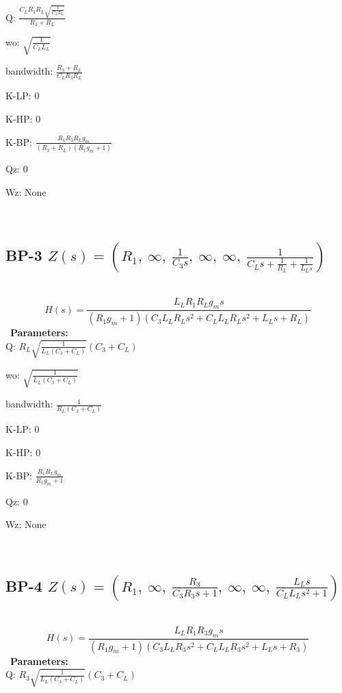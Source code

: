 \documentclass{article}
\begin{document}
Q: $\frac{C_{L} R_{3} R_{L} \sqrt{\frac{1}{C_{L} L_{L}}}}{R_{3} + R_{L}}$\ 

wo: $\sqrt{\frac{1}{C_{L} L_{L}}}$\ 

bandwidth: $\frac{R_{3} + R_{L}}{C_{L} R_{3} R_{L}}$\ 

K-LP: $0$\ 

K-HP: $0$\ 

K-BP: $\frac{R_{1} R_{3} R_{L} g_{m}}{\left(R_{3} + R_{L}\right) \left(R_{1} g_{m} + 1\right)}$\ 

Qz: $0$\ 

Wz: $\text{None}$\ 

\ 

\subsection{BP-3 $Z(s) = \left( R_{1}, \  \infty, \  \frac{1}{C_{3} s}, \  \infty, \  \infty, \  \frac{1}{C_{L} s + \frac{1}{R_{L}} + \frac{1}{L_{L} s}}\right)$ } \ 
\textbf{\[H(s) = \frac{L_{L} R_{1} R_{L} g_{m} s}{\left(R_{1} g_{m} + 1\right) \left(C_{3} L_{L} R_{L} s^{2} + C_{L} L_{L} R_{L} s^{2} + L_{L} s + R_{L}\right)}\] } \ 
\textbf{Parameters:}\\ 

Q: $R_{L} \sqrt{\frac{1}{L_{L} \left(C_{3} + C_{L}\right)}} \left(C_{3} + C_{L}\right)$\ 

wo: $\sqrt{\frac{1}{L_{L} \left(C_{3} + C_{L}\right)}}$\ 

bandwidth: $\frac{1}{R_{L} \left(C_{3} + C_{L}\right)}$\ 

K-LP: $0$\ 

K-HP: $0$\ 

K-BP: $\frac{R_{1} R_{L} g_{m}}{R_{1} g_{m} + 1}$\ 

Qz: $0$\ 

Wz: $\text{None}$\ 

\ 

\subsection{BP-4 $Z(s) = \left( R_{1}, \  \infty, \  \frac{R_{3}}{C_{3} R_{3} s + 1}, \  \infty, \  \infty, \  \frac{L_{L} s}{C_{L} L_{L} s^{2} + 1}\right)$ } \ 
\textbf{\[H(s) = \frac{L_{L} R_{1} R_{3} g_{m} s}{\left(R_{1} g_{m} + 1\right) \left(C_{3} L_{L} R_{3} s^{2} + C_{L} L_{L} R_{3} s^{2} + L_{L} s + R_{3}\right)}\] } \ 
\textbf{Parameters:}\\ 

Q: $R_{3} \sqrt{\frac{1}{L_{L} \left(C_{3} + C_{L}\right)}} \left(C_{3} + C_{L}\right)$\ 
\end{document}
